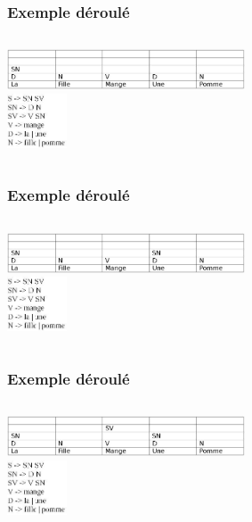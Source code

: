 \documentclass[table]{beamer}
\begin{document}
\begin{frame}
\frametitle{Exemple déroulé}
  \begin{columns}
  \begin{column}{0.6\textwidth}
     \includegraphics[width=200pt,]{7.jpeg}  \\
  
  \includegraphics[width=50pt,]{11.jpeg}  
  \end{column}
  \end{columns}
\end{frame}

\begin{frame}
\frametitle{Exemple déroulé}
  \begin{columns}
  \begin{column}{0.6\textwidth}
     \includegraphics[width=200pt,]{8.jpeg}  \\
  \includegraphics[width=50pt,]{11.jpeg}  
  \end{column}
  \end{columns}
\end{frame}

\begin{frame}
\frametitle{Exemple déroulé}
  \begin{columns}
  \begin{column}{0.6\textwidth}
     \includegraphics[width=200pt,]{9.jpeg}  \\
  \includegraphics[width=50pt,]{11.jpeg}  
  \end{column}
  \end{columns}
\end{frame}
\end{document}
